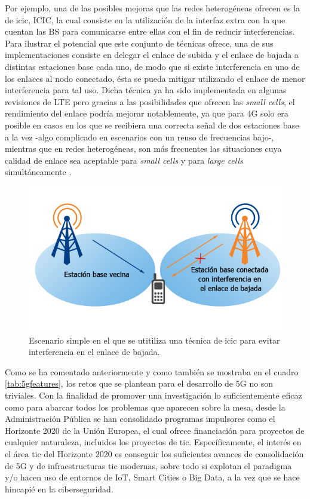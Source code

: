 Por ejemplo, una de las posibles mejoras que las redes heterogéneas ofrecen es la de \acl{icic}, ICIC, la cual consiste en la utilización de la interfaz extra con la que cuentan las BS para comunicarse entre ellas con el fin  de reducir interferencias. Para ilustrar el potencial que este conjunto de técnicas ofrece, una de sus implementaciones consiste en delegar el enlace de subida y el enlace de bajada a distintas estaciones base cada uno, de modo que si existe interferencia en uno de los enlaces al nodo conectado, ésta se pueda mitigar utilizando el enlace de menor interferencia para tal uso. Dicha técnica ya ha sido implementada en algunas revisiones de LTE pero gracias a las posibilidades que ofrecen las \textit{small cells}, el rendimiento del enlace podría mejorar notablemente, ya que para 4G solo era posible en casos en los que se recibiera una correcta señal de dos estaciones base a la vez -algo complicado en escenarios con un reuso de frecuencias bajo-, mientras que en redes heterogéneas, son más frecuentes las situaciones cuya calidad de enlace sea aceptable para \textit{small cells} y para \textit{large cells} simultáneamente \cite{ieeeicic}. 

\begin{figure}[!hb]
	\centering
    \includegraphics[width=0.75\linewidth]{imagenes/icic.png}
	\caption{Escenario simple en el que se utitiliza una técnica de \acs{icic} para evitar interferencia en el enlace de bajada.}
	\label{fig:icic}
\end{figure}

Como se ha comentado anteriormente y como también se mostraba en el cuadro \ref{tab:5gfeatures}, los retos que se plantean para el desarrollo de 5G no son triviales. Con la finalidad de promover una investigación lo suficientemente eficaz como para abarcar todos los problemas que aparecen sobre la mesa, desde la Administración Pública se han consolidado programas impulsores como el Horizonte 2020 de la Unión Europea, el cual ofrece financiación para proyectos de cualquier naturaleza, incluidos los proyectos de \ac{tic}. Específicamente, el interés en el área \acs{tic} del Horizonte 2020 es conseguir los suficientes avances de consolidación de 5G y de infraestructuras \acs{tic} modernas, sobre todo si explotan el paradigma y/o hacen uso de entornos de IoT, Smart Cities o Big Data, a la vez que se hace hincapié en la ciberseguridad.


